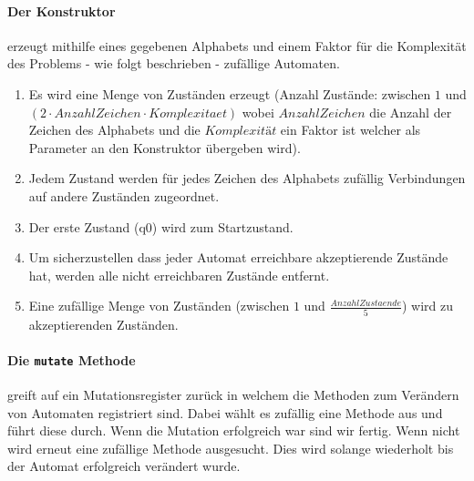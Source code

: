 \paragraph{Der Konstruktor} erzeugt mithilfe eines gegebenen Alphabets und einem Faktor für die Komplexität des Problems - wie folgt beschrieben - zufällige Automaten.
\begin{enumerate}
  \item Es wird eine Menge von Zuständen erzeugt (Anzahl Zustände: zwischen $1$ und $(2 \cdot AnzahlZeichen \cdot Komplexitaet)$ wobei $AnzahlZeichen$ die Anzahl der Zeichen des Alphabets und die $Komplexität$ ein Faktor ist welcher als Parameter an den Konstruktor übergeben wird).
  \item Jedem Zustand werden für jedes Zeichen des Alphabets zufällig Verbindungen auf andere Zuständen zugeordnet.
  \item Der erste Zustand (q0) wird zum Startzustand.
  \item Um sicherzustellen dass jeder Automat erreichbare akzeptierende Zustände hat, werden alle nicht erreichbaren Zustände entfernt.
  \item Eine zufällige Menge von Zuständen (zwischen $1$ und $\frac{AnzahlZustaende}{5}$) wird zu akzeptierenden Zuständen.
\end{enumerate}

\paragraph{Die \lstinline$mutate$ Methode} greift auf ein Mutationsregister zurück in welchem die Methoden zum Verändern von Automaten registriert sind. Dabei wählt es zufällig eine Methode aus und führt diese durch. Wenn die Mutation erfolgreich war sind wir fertig. Wenn nicht wird erneut eine zufällige Methode ausgesucht. Dies wird solange wiederholt bis der Automat erfolgreich verändert wurde.

